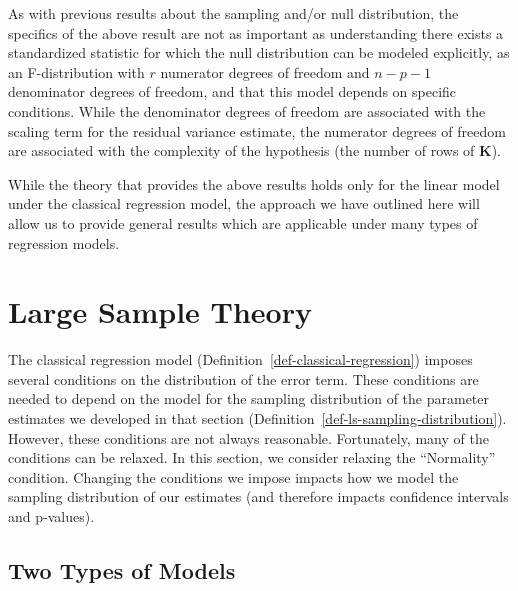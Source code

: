 \documentclass[
  letterpaper,
  DIV=11,
  numbers=noendperiod]{scrreprt}
\theoremstyle{definition}
\theoremstyle{definition}
\theoremstyle{remark}
\begin{document}
As with previous results about the sampling and/or null distribution,
the specifics of the above result are not as important as understanding
there exists a standardized statistic for which the null distribution
can be modeled explicitly, as an F-distribution with \(r\) numerator
degrees of freedom and \(n-p-1\) denominator degrees of freedom, and
that this model depends on specific conditions. While the denominator
degrees of freedom are associated with the scaling term for the residual
variance estimate, the numerator degrees of freedom are associated with
the complexity of the hypothesis (the number of rows of \(\mathbf{K}\)).

While the theory that provides the above results holds only for the
linear model under the classical regression model, the approach we have
outlined here will allow us to provide general results which are
applicable under many types of regression models.

\hypertarget{sec-modeling-large-sample-theory}{%
\chapter{Large Sample Theory}\label{sec-modeling-large-sample-theory}}

\providecommand{\norm}[1]{\left\lVert#1\right\rVert}
\providecommand{\abs}[1]{\left\lvert#1\right\rvert}
\providecommand{\dist}[1]{\stackrel{\text{#1}}{\sim}}
\providecommand{\ind}[1]{\mathbb{I}\left(#1\right)}
\providecommand{\bm}[1]{\mathbf{#1}}
\providecommand{\bs}[1]{\boldsymbol{#1}}
\providecommand{\Ell}{\mathcal{L}}
\providecommand{\indep}{\perp\negthickspace\negmedspace\perp}

The classical regression model
(Definition~\ref{def-classical-regression}) imposes several conditions
on the distribution of the error term. These conditions are needed to
depend on the model for the sampling distribution of the parameter
estimates we developed in that section
(Definition~\ref{def-ls-sampling-distribution}). However, these
conditions are not always reasonable. Fortunately, many of the
conditions can be relaxed. In this section, we consider relaxing the
``Normality'' condition. Changing the conditions we impose impacts how
we model the sampling distribution of our estimates (and therefore
impacts confidence intervals and p-values).

\hypertarget{two-types-of-models}{%
\section{Two Types of Models}\label{two-types-of-models}}
\end{document}
